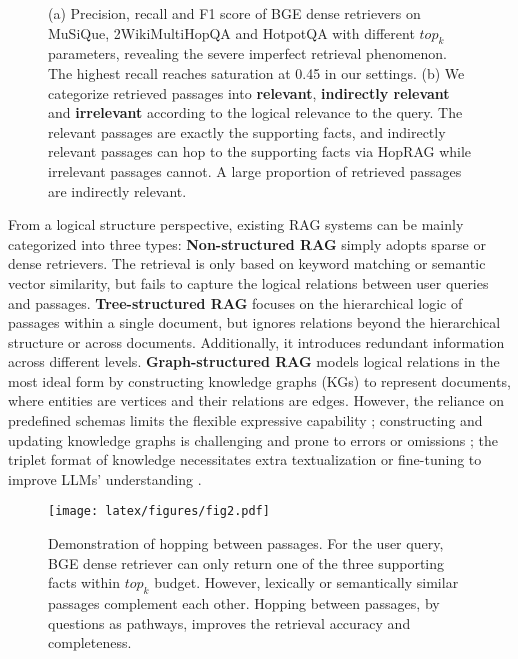 \begin{figure*}[ht]
\centering
{}
\caption{(a) Precision, recall and F1 score of BGE dense retrievers on MuSiQue, 2WikiMultiHopQA and HotpotQA with different $top_k$ parameters, revealing the severe imperfect retrieval phenomenon. The highest recall reaches saturation at 0.45 in our settings.
(b) We categorize retrieved passages into \textbf{relevant}, \textbf{indirectly relevant} and \textbf{irrelevant} according to the logical relevance to the query. The relevant passages are exactly the supporting facts, and indirectly relevant passages can hop to the supporting facts via HopRAG while irrelevant passages cannot. A large proportion of retrieved passages are indirectly relevant. 
}\label{motivation_figure}
\end{figure*}


From a logical structure perspective, existing RAG systems can be mainly categorized into three types: 
\textbf{Non-structured RAG} simply adopts sparse or dense retrievers. The retrieval is only based on keyword matching or semantic vector similarity, but fails to capture the logical relations between user queries and passages.
\textbf{Tree-structured RAG} \citep{sarthi_raptor_2024, chen_walking_2023, fatehkia2024traglessonsllmtrenches} focuses on the hierarchical logic of passages within a single document, but ignores relations beyond the hierarchical structure or across documents. Additionally, it introduces redundant information across different levels.
\textbf{Graph-structured RAG} \citep{soman2024biomedicalknowledgegraphoptimizedprompt,kang2023knowledgegraphaugmentedlanguagemodels,edge_local_2024,guo_lightrag_2024} models logical relations in the most ideal form by constructing knowledge graphs (KGs) to represent documents, where entities are vertices and their relations are edges. However, the reliance on predefined schemas limits the flexible expressive capability \citep{li_graph_2024}; constructing and updating knowledge graphs is challenging and prone to errors or omissions \citep {edge_local_2024}; the triplet format of knowledge necessitates extra textualization or fine-tuning to improve LLMs' understanding \citep{he_g-retriever_2024}.


\begin{figure}[t]
  \texttt{[image: latex/figures/fig2.pdf]}
  \caption{Demonstration of hopping between passages. For the user query, BGE dense retriever can only return one of the three supporting facts within $top_k$ budget. However, lexically or semantically similar passages complement each other.
  Hopping between passages, by questions as pathways, improves the retrieval accuracy and completeness.}
  \label{fig:demo}
\end{figure}

